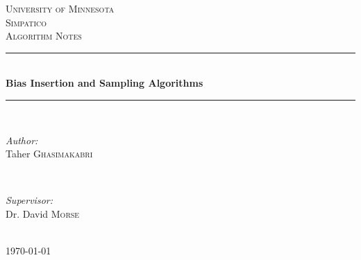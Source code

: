 \documentclass[12pt]{article} %
\begin{document}

\begin{titlepage}

\newcommand{\HRule}{\rule{\linewidth}{0.5mm}} %

\center %

\textsc{\LARGE University of Minnesota}\\[1.5cm] %
\textsc{\Large Simpatico}\\[0.5cm] %
\textsc{\large Algorithm Notes}\\[0.5cm] %

\HRule \\[0.4cm]
{ \huge \bfseries Bias Insertion and Sampling Algorithms}\\[0.4cm] %
\HRule \\[1.5cm]

\begin{minipage}{0.4\textwidth}
\begin{flushleft} \large
\emph{Author:}\\
Taher \textsc{Ghasimakabri} %
\end{flushleft}
\end{minipage}
~
\begin{minipage}{0.4\textwidth}
\begin{flushright} \large
\emph{Supervisor:} \\
Dr. David \textsc{Morse} %
\end{flushright}
\end{minipage}\\[4cm]

{\large \today}\\[3cm] %


\vfill %

\end{titlepage}

\end{document}
